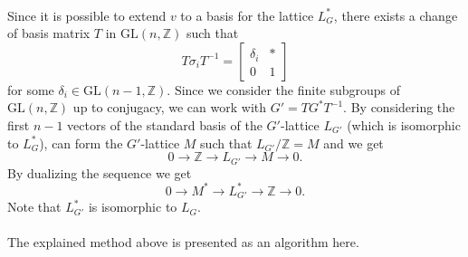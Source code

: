 \documentclass{article}
\theoremstyle{plain}
\theoremstyle{definition}
\newcommand{\Z}{\ensuremath{\mathbb{Z}}}
\begin{document}
\\  
Since it is possible to extend $v$ to a basis for the lattice $L^*_G$, there exists a change of basis matrix $T$ in $\mathrm{GL}(n,\Z)$ such that
$$T \sigma_i T^{-1} = \left[ \begin{array}{c|c}
\delta_i & \ast\\
\hline 0 & 1
\end{array} \right]
$$ 
for some $\delta_i \in \mathrm{GL}(n-1,\Z).$ Since we consider the finite subgroups of $\mathrm{GL}(n,\Z)$ up to conjugacy, we can work with $G' = TG^*T^{-1}$. By considering the first $n-1$ vectors of the standard basis of the $G'$-lattice $L_{G'}$ (which is isomorphic to $L^*_G$), can form the $G'$-lattice $M$ such that $L_{G'}/\Z = M$ and we get 
$$0 \longrightarrow \Z \longrightarrow L_{G'} \longrightarrow M \longrightarrow 0.$$
By dualizing the sequence we get  $$0 \longrightarrow M^* \longrightarrow L^*_{G'} \longrightarrow \Z \longrightarrow 0.$$
Note that $L^*_{G'}$ is isomorphic to $L_G$.\\
\\
The explained method above is presented as an algorithm here.
\end{document}
